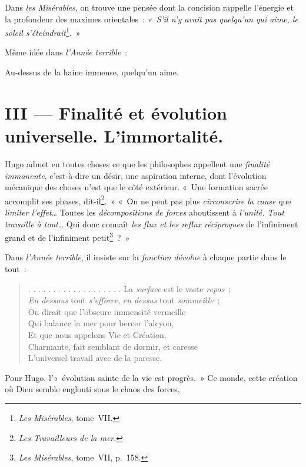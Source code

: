 \documentclass[french,twoside]{book} %
\begin{document}
\noindent Dans \emph{les Misérables}, on trouve une pensée dont la concision rappelle l’énergie et la profondeur des maximes orientales : \emph{« S’il n’y avait pas quelqu’un qui aime, le soleil s’éteindrait}\footnote{\emph{Les Misérables}, tome VII.}. »\par
Même idée dans \emph{l’Année terrible} :\par

Au-dessus de la haine immense, quelqu’un aime.\\

\section[{III — Finalité et évolution universelle. L’immortalité.}]{III — Finalité et évolution universelle. L’immortalité.}
\noindent Hugo admet en toutes choses ce que les philosophes appellent une \emph{finalité immanente}, c’est-à-dire un désir, une aspiration interne, dont l’évolution mécanique des choses n’est que le côté extérieur. « Une formation sacrée accomplit ses phases, dit-il\footnote{\emph{Les Travailleurs de la mer}.}. » « On ne peut pas plus \emph{circonscrire la cause} que \emph{limiter l’effet}… Toutes les \emph{décompositions de forces} aboutissent à \emph{l’unité. Tout travaille à tout}… Qui donc connaît \emph{les flux et les reflux réciproques} de l’infiniment grand et de l’infiniment petit\footnote{\emph{Les Misérables}, tome VII, p. 158.} ? »\par
Dans \emph{l’Année terrible}, il insiste sur la \emph{fonction dévolue} à chaque partie dans le tout :\par


\begin{verse}
. . . . . . . . . . . . . . . . . . . La \emph{surface} est le vaste \emph{repos} ;\\
\emph{En dessous} tout \emph{s’efforce}, \emph{en dessus} tout \emph{sommeille} ;\\
On dirait que l’obscure immensité vermeille\\
Qui balance la mer pour bercer l’alcyon,\\
Et que nous appelons Vie et Création,\\
Charmante, fait semblant de dormir, et caresse\\
L’universel travail avec de la paresse.\\
\end{verse}

\noindent Pour Hugo, l’« évolution sainte de la vie est progrès. » Ce monde, cette création où Dieu semble englouti sous le chaos des forces,\par
\end{document}
